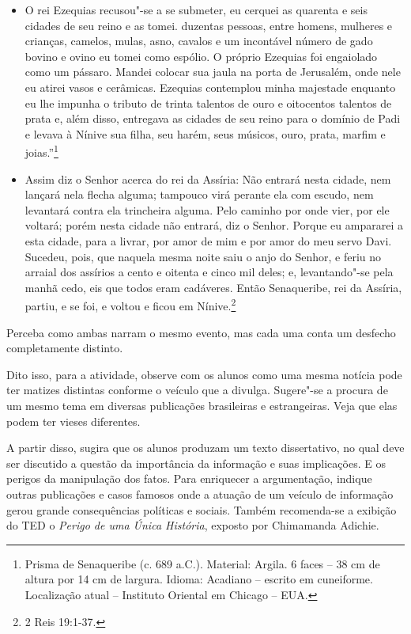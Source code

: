 \documentclass[12pt]{extarticle}
\begin{document}
\begin{itemize}
\item
O rei Ezequias recusou"-se a se submeter, eu cerquei as quarenta e seis
cidades de seu reino e as tomei. duzentas pessoas, entre homens,
mulheres e crianças, camelos, mulas, asno, cavalos e um incontável
número de gado bovino e ovino eu tomei como espólio. O próprio
Ezequias foi engaiolado como um pássaro. Mandei colocar sua jaula na
porta de Jerusalém, onde nele eu atirei vasos e cerâmicas. Ezequias
contemplou minha majestade enquanto eu lhe impunha o tributo de trinta
talentos de ouro e oitocentos talentos de prata e, além disso,
entregava as cidades de seu reino para o domínio de Padi e levava à
Nínive sua filha, seu harém, seus músicos, ouro, prata, marfim e
joias.''\footnote{Prisma de Senaqueribe (c. 689 a.C.). Material: Argila. 6 faces -- 38 cm de altura por 14 cm de largura. Idioma: Acadiano -- escrito em
cuneiforme. Localização atual -- Instituto Oriental em Chicago --
EUA.}

\item
  Assim diz o Senhor acerca do rei da Assíria: Não entrará nesta cidade,
  nem lançará nela flecha alguma; tampouco virá perante ela com escudo,
  nem levantará contra ela trincheira alguma. Pelo caminho por onde
  vier, por ele voltará; porém nesta cidade não entrará, diz o Senhor.
  Porque eu ampararei a esta cidade, para a livrar, por amor de mim e
  por amor do meu servo Davi. Sucedeu, pois, que naquela mesma noite
  saiu o anjo do Senhor, e feriu no arraial dos assírios a cento e
  oitenta e cinco mil deles; e, levantando"-se pela manhã cedo, eis que
  todos eram cadáveres. Então Senaqueribe, rei da Assíria, partiu, e se
  foi, e voltou e ficou em Nínive.\footnote{2 Reis 19:1-37.}
\end{itemize}

Perceba como ambas narram o mesmo evento, mas cada uma conta um desfecho
completamente distinto.

Dito isso, para a atividade, observe com os alunos como uma mesma
notícia pode ter matizes distintas conforme o veículo que a divulga.
Sugere"-se a procura de um mesmo tema em diversas publicações brasileiras
e estrangeiras. Veja que elas podem ter vieses diferentes.

A partir disso, sugira que os alunos produzam um texto dissertativo, no
qual deve ser discutido a questão da importância da informação e suas
implicações. E os perigos da manipulação dos fatos. Para enriquecer a
argumentação, indique outras publicações e casos famosos onde a atuação
de um veículo de informação gerou grande consequências políticas e
sociais. Também recomenda-se a exibição do TED o \emph{Perigo de uma
Única História}, exposto por Chimamanda Adichie.
\end{document}
